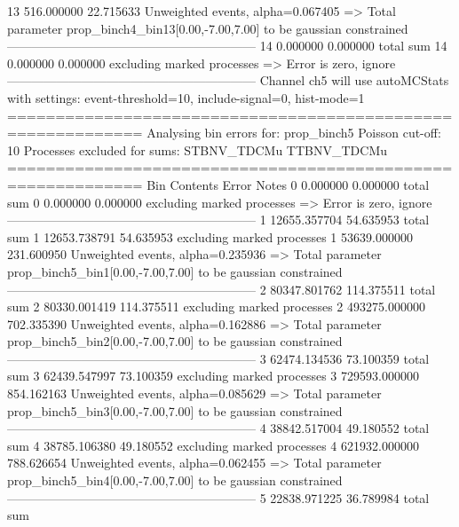 13         516.000000      22.715633       Unweighted events, alpha=0.067405
  => Total parameter prop_binch4_bin13[0.00,-7.00,7.00] to be gaussian constrained
------------------------------------------------------------
14         0.000000        0.000000        total sum                     
14         0.000000        0.000000        excluding marked processes    
  => Error is zero, ignore      
------------------------------------------------------------
Channel ch5 will use autoMCStats with settings: event-threshold=10, include-signal=0, hist-mode=1
============================================================
Analysing bin errors for: prop_binch5
Poisson cut-off: 10
Processes excluded for sums: STBNV_TDCMu TTBNV_TDCMu
============================================================
Bin        Contents        Error           Notes                         
0          0.000000        0.000000        total sum                     
0          0.000000        0.000000        excluding marked processes    
  => Error is zero, ignore      
------------------------------------------------------------
1          12655.357704    54.635953       total sum                     
1          12653.738791    54.635953       excluding marked processes    
1          53639.000000    231.600950      Unweighted events, alpha=0.235936
  => Total parameter prop_binch5_bin1[0.00,-7.00,7.00] to be gaussian constrained
------------------------------------------------------------
2          80347.801762    114.375511      total sum                     
2          80330.001419    114.375511      excluding marked processes    
2          493275.000000   702.335390      Unweighted events, alpha=0.162886
  => Total parameter prop_binch5_bin2[0.00,-7.00,7.00] to be gaussian constrained
------------------------------------------------------------
3          62474.134536    73.100359       total sum                     
3          62439.547997    73.100359       excluding marked processes    
3          729593.000000   854.162163      Unweighted events, alpha=0.085629
  => Total parameter prop_binch5_bin3[0.00,-7.00,7.00] to be gaussian constrained
------------------------------------------------------------
4          38842.517004    49.180552       total sum                     
4          38785.106380    49.180552       excluding marked processes    
4          621932.000000   788.626654      Unweighted events, alpha=0.062455
  => Total parameter prop_binch5_bin4[0.00,-7.00,7.00] to be gaussian constrained
------------------------------------------------------------
5          22838.971225    36.789984       total sum                     
